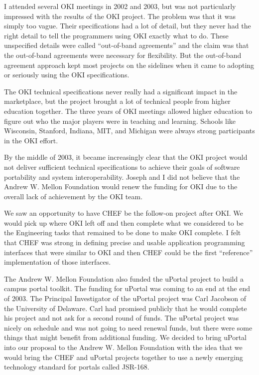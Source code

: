 \documentclass[12pt]{book}
\begin{document}
I attended several OKI meetings in 2002 and 2003, but was not particularly impressed
with the results of the OKI project.  The problem was that it was simply
too vague.  Their specifications had a lot of detail, but they never had the right
detail to tell the programmers using OKI exactly what to do.   These unspecified details
were called ``out-of-band agreements'' and the claim was that the out-of-band agreements
were necessary for flexibility.  But the out-of-band agreement approach kept most projects
on the sidelines when it came to adopting or seriously using the OKI specifications.

The OKI technical specifications never really had a significant impact
in the marketplace, but the project brought a lot of technical people from higher
education together.  The three years of OKI meetings allowed higher education to figure out
who the major players were in teaching and learning.  Schools like
Wisconsin, Stanford, Indiana, MIT, and Michigan were always strong participants in the OKI
effort.

By the middle of 2003, it became increasingly clear that the OKI project would
not deliver sufficient technical specifications to achieve their goals of software portability
and system interoperability.  Joseph and I did not believe that the
Andrew W. Mellon Foundation would
renew the funding for OKI due to the overall lack of achievement by the OKI team.

We saw an opportunity to have CHEF be the follow-on project after OKI.   We would pick up
where OKI left off and then complete what we considered to be the Engineering tasks that
remained to be done to make OKI complete.   I felt that CHEF was strong in defining
precise and usable application programming interfaces that were similar to OKI
and then CHEF could be the first ``reference'' implementation of those interfaces.

The Andrew W. Mellon Foundation also funded the uPortal project to build a campus
portal toolkit. The funding for uPortal was coming to an end at the end of 2003.
The Principal Investigator of the uPortal project was Carl Jacobson
of the University of Delaware.
Carl had promised publicly that he would complete his project and not ask for
a second round of funds.   The uPortal project was nicely on schedule and was not going
to need renewal funds, but there were some things that might benefit from additional
funding.  We decided to bring uPortal into our proposal to the Andrew W. Mellon
Foundation with the idea that we would bring the CHEF and uPortal projects together
to use a newly emerging technology standard for portals called JSR-168.
\end{document}
